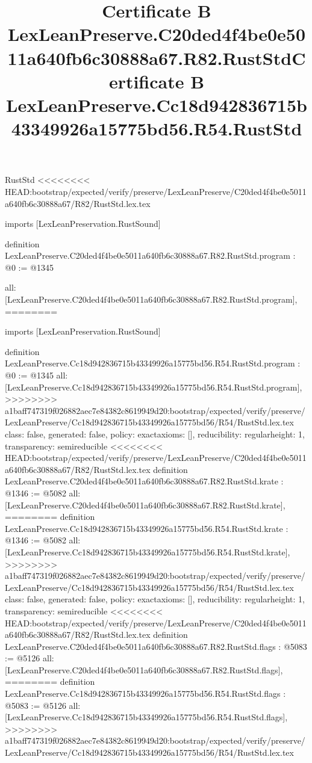 \begin{lexlean}{RustStd}
<<<<<<<< HEAD:bootstrap/expected/verify/preserve/LexLeanPreserve/C20ded4f4be0e5011a640fb6c30888a67/R82/RustStd.lex.tex
\title{Certificate B LexLeanPreserve.C20ded4f4be0e5011a640fb6c30888a67.R82.RustStd}
\begin{coremodule}
imports [LexLeanPreservation.RustSound]

definition LexLeanPreserve.C20ded4f4be0e5011a640fb6c30888a67.R82.RustStd.program : @0 := @1345 {
  all: [LexLeanPreserve.C20ded4f4be0e5011a640fb6c30888a67.R82.RustStd.program],
========
\title{Certificate B LexLeanPreserve.Cc18d942836715b43349926a15775bd56.R54.RustStd}
\begin{coremodule}
imports [LexLeanPreservation.RustSound]

definition LexLeanPreserve.Cc18d942836715b43349926a15775bd56.R54.RustStd.program : @0 := @1345 {
  all: [LexLeanPreserve.Cc18d942836715b43349926a15775bd56.R54.RustStd.program],
>>>>>>>> a1baff747319f026882aec7e84382c8619949d20:bootstrap/expected/verify/preserve/LexLeanPreserve/Cc18d942836715b43349926a15775bd56/R54/RustStd.lex.tex
  class: false,
  generated: false,
  policy: exact{axioms: []},
  reducibility: regular{height: 1},
  transparency: semireducible
}
<<<<<<<< HEAD:bootstrap/expected/verify/preserve/LexLeanPreserve/C20ded4f4be0e5011a640fb6c30888a67/R82/RustStd.lex.tex
definition LexLeanPreserve.C20ded4f4be0e5011a640fb6c30888a67.R82.RustStd.krate : @1346 := @5082 {
  all: [LexLeanPreserve.C20ded4f4be0e5011a640fb6c30888a67.R82.RustStd.krate],
========
definition LexLeanPreserve.Cc18d942836715b43349926a15775bd56.R54.RustStd.krate : @1346 := @5082 {
  all: [LexLeanPreserve.Cc18d942836715b43349926a15775bd56.R54.RustStd.krate],
>>>>>>>> a1baff747319f026882aec7e84382c8619949d20:bootstrap/expected/verify/preserve/LexLeanPreserve/Cc18d942836715b43349926a15775bd56/R54/RustStd.lex.tex
  class: false,
  generated: false,
  policy: exact{axioms: []},
  reducibility: regular{height: 1},
  transparency: semireducible
}
<<<<<<<< HEAD:bootstrap/expected/verify/preserve/LexLeanPreserve/C20ded4f4be0e5011a640fb6c30888a67/R82/RustStd.lex.tex
definition LexLeanPreserve.C20ded4f4be0e5011a640fb6c30888a67.R82.RustStd.flags : @5083 := @5126 {
  all: [LexLeanPreserve.C20ded4f4be0e5011a640fb6c30888a67.R82.RustStd.flags],
========
definition LexLeanPreserve.Cc18d942836715b43349926a15775bd56.R54.RustStd.flags : @5083 := @5126 {
  all: [LexLeanPreserve.Cc18d942836715b43349926a15775bd56.R54.RustStd.flags],
>>>>>>>> a1baff747319f026882aec7e84382c8619949d20:bootstrap/expected/verify/preserve/LexLeanPreserve/Cc18d942836715b43349926a15775bd56/R54/RustStd.lex.tex
}}}
\end{coremodule}}
\end{coremodule}
\end{lexlean}
